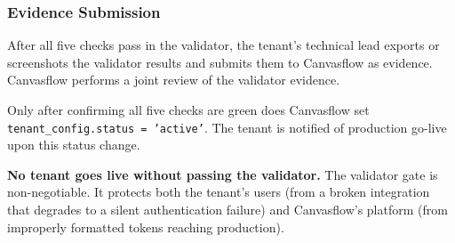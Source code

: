 \subsubsection{Evidence Submission}

After all five checks pass in the validator, the tenant's technical lead exports or
screenshots the validator results and submits them to Canvasflow as evidence. Canvasflow
performs a joint review of the validator evidence.

Only after confirming all five checks are green does Canvasflow set \linebreak
\texttt{tenant\_config.status = 'active'}. The tenant is notified of production go-live
upon this status change.

\textbf{No tenant goes live without passing the validator.} The validator gate is
non-negotiable. It protects both the tenant's users (from a broken integration that
degrades to a silent authentication failure) and Canvasflow's platform (from improperly
formatted tokens reaching production).
